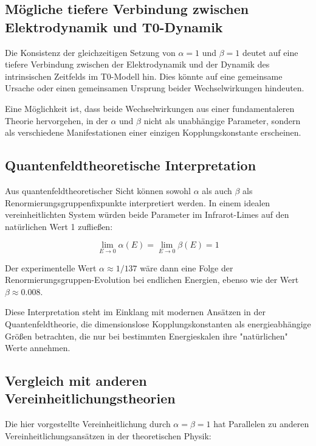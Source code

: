 \documentclass[12pt,a4paper]{article}
\begin{document}
	\subsection{Mögliche tiefere Verbindung zwischen Elektrodynamik und T0-Dynamik}
	
	Die Konsistenz der gleichzeitigen Setzung von $\alpha = 1$ und $\beta = 1$ deutet auf eine tiefere Verbindung zwischen der Elektrodynamik und der Dynamik des intrinsischen Zeitfelds im T0-Modell hin. Dies könnte auf eine gemeinsame Ursache oder einen gemeinsamen Ursprung beider Wechselwirkungen hindeuten.
	
	Eine Möglichkeit ist, dass beide Wechselwirkungen aus einer fundamentaleren Theorie hervorgehen, in der $\alpha$ und $\beta$ nicht als unabhängige Parameter, sondern als verschiedene Manifestationen einer einzigen Kopplungskonstante erscheinen.
	
	\subsection{Quantenfeldtheoretische Interpretation}
	
	Aus quantenfeldtheoretischer Sicht können sowohl $\alpha$ als auch $\beta$ als Renormierungsgruppenfixpunkte interpretiert werden. In einem idealen vereinheitlichten System würden beide Parameter im Infrarot-Limes auf den natürlichen Wert 1 zufließen:
	
	\begin{equation}
		\lim_{E \to 0} \alpha(E) = \lim_{E \to 0} \beta(E) = 1
	\end{equation}
	
	Der experimentelle Wert $\alpha \approx 1/137$ wäre dann eine Folge der Renormierungsgruppen-Evolution bei endlichen Energien, ebenso wie der Wert $\beta \approx 0.008$.
	
	Diese Interpretation steht im Einklang mit modernen Ansätzen in der Quantenfeldtheorie, die dimensionslose Kopplungskonstanten als energieabhängige Größen betrachten, die nur bei bestimmten Energieskalen ihre "natürlichen" Werte annehmen.
	
	\subsection{Vergleich mit anderen Vereinheitlichungstheorien}
	
	Die hier vorgestellte Vereinheitlichung durch $\alpha = \beta = 1$ hat Parallelen zu anderen Vereinheitlichungsansätzen in der theoretischen Physik:
	
\end{document}
